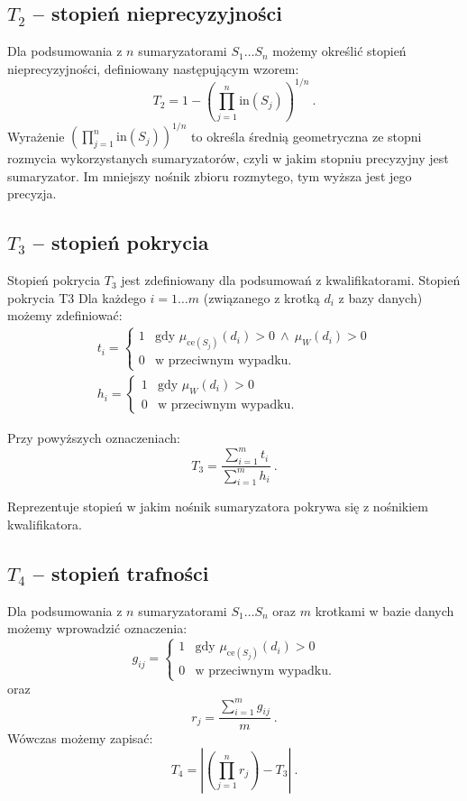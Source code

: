 \documentclass{classrep}
\begin{document}
\subsection{\(T_2\) -- stopień nieprecyzyjności}
Dla podsumowania z \(n\) sumaryzatorami \(S_1 \ldots S_n\) możemy określić stopień nieprecyzyjności,
definiowany następującym wzorem:
\[T_2 = 1 - \left(\prod_{j=1}^{n} \mathrm{in}(S_j)\right)^{1/n} ~\mbox{.}\]
Wyrażenie \(\left(\prod_{j=1}^{n} \mathrm{in}(S_j)\right)^{1/n}\) to określa średnią geometryczna ze stopni rozmycia wykorzystanych sumaryzatorów, czyli w jakim stopniu precyzyjny jest sumaryzator. Im mniejszy nośnik zbioru rozmytego, tym wyższa jest jego precyzja.
   

\subsection{\(T_3\) -- stopień pokrycia}
Stopień pokrycia \(T_3\) jest zdefiniowany dla podsumowań z kwalifikatorami. Stopień pokrycia T3 
Dla każdego \(i=1\ldots m\) (związanego z krotką \(d_i\) z bazy
danych) możemy zdefiniować:
\[
\begin{array}{l}
t_i = \begin{cases}
1 & \mbox{gdy } \mu_{\mathrm{ce}(S_j)}(d_i) > 0 ~ \wedge ~ \mu_{W}(d_i) > 0 \\
0 & \mbox{w przeciwnym wypadku.}
\end{cases} \\
h_i = \begin{cases}
1 & \mbox{gdy } \mu_{W}(d_i) > 0 \\
0 & \mbox{w przeciwnym wypadku.}
\end{cases}
\end{array}\]

Przy powyższych oznaczeniach:
\[T_3 = \frac{\sum_{i=1}^{m} t_i}{\sum_{i=1}^{m} h_i} ~\mbox{.}\]

Reprezentuje stopień w jakim nośnik sumaryzatora pokrywa się z nośnikiem kwalifikatora.


\subsection{\(T_4\) -- stopień trafności}
Dla podsumowania z \(n\) sumaryzatorami \(S_1 \ldots S_n\)
oraz \(m\) krotkami w bazie danych możemy wprowadzić oznaczenia:
\[g_{ij} = \begin{cases}
1 & \mbox{gdy } \mu_{\mathrm{ce}(S_j)}(d_i) > 0 \\
0 & \mbox{w przeciwnym wypadku.}
\end{cases}\]
oraz
\[r_j = \frac{\sum_{i=1}^{m} g_{ij}}{m} ~\mbox{.}\]
Wówczas możemy zapisać:
\[T_4 = \left|\left( \prod_{j=1}^{n} r_j \right) - T_3\right| ~\mbox{.}\]
\end{document}
